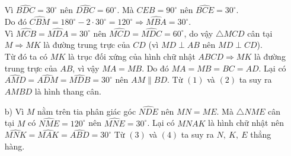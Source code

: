 \begin{bt}
{{\begin{tikzpicture}[line join=round, line cap=round]
			\end{tikzpicture}
		}
		\begin{enumerate}
			\item[] Vì $ \widehat{BDC}=30^{\circ} $ nên $ \widehat{DBC}=60^{\circ} $. Mà $ \widehat{CEB}=90^{\circ} $ nên $ \widehat{BCE}=30^{\circ} $.\\
			Do đó $ \widehat{CBM}=180^{\circ}-2\cdot 30^{\circ}=120^{\circ}\Rightarrow \widehat{MBA}=30^{\circ} $.\\
			Vì $ \widehat{MCB}=\widehat{MDA}=30^{\circ} $ nên $ \widehat{MCD}=\widehat{MDC}=60^{\circ} $, do vậy $ \triangle MCD $ cân tại $ M\Rightarrow MK $ là đường trung trực của $ CD $ (vì $ MD\perp AB $ nên $ MD\perp CD $).\\
			Từ đó ta có $ MK $ là trục đối xứng của hình chữ nhật $ ABCD\Rightarrow MK $ là đường trung trực của $ AB $, vì vậy $ MA=MB $. Do đó $ MA=MB=BC=AD $.\noindent
			Lại có $ \widehat{AMD}=\widehat{ADM}=\widehat{MDB}=30^{\circ} $ nên $ AM\parallel BD $.\noindent
			Từ $ (1) $ và $ (2) $ ta suy ra $ AMBD $ là hình thang cân.
			\item[b)] Vì $ M $ nằm trên tia phân giác góc $ \widehat{NDE} $ nên $ MN=ME $. Mà $ \triangle NME $ cân tại $ M $ có $ \widehat{NME}=120^{\circ} $ nên $ \widehat{MNE}=30^{\circ} $.\noindent
			Lại có $ MNAK $ là hình chữ nhật nên $ \widehat{MNK}=\widehat{MAK}=\widehat{ABD}=30^{\circ} $\noindent
			Từ $ (3) $ và $ (4) $ ta suy ra $ N,\ K,\ E $ thẳng hàng.
		\end{enumerate}
	}
\end{bt}
